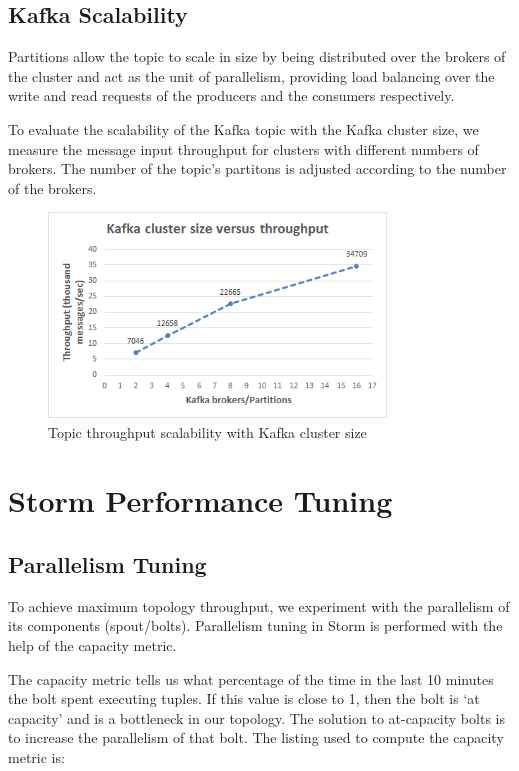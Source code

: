 \subsection{Kafka Scalability}

Partitions allow the topic to scale in size by being distributed over the brokers of the cluster and act as the unit of parallelism, providing load balancing over the write and read requests of the producers and the consumers respectively.

To evaluate the scalability of the Kafka topic with the Kafka cluster size, we measure the message input throughput for clusters with different numbers of brokers. The number of the topic's partitons is adjusted according to the number of the brokers.

\begin{figure}[H]
\centering
\includegraphics[width=0.8\textwidth]{figures/benchmarks_kafka_scalability}
\caption{Topic throughput scalability with Kafka cluster size}
\label{figure:benchmarks_kafka_scalability}
\end{figure}


\section{Storm Performance Tuning}

\subsection{Parallelism Tuning}\label{subsection:benchmarks_storm_tuning}

To achieve maximum topology throughput, we experiment with the parallelism of its components (spout/bolts). Parallelism tuning in Storm is performed with the help of the capacity metric. 

The capacity metric tells us what percentage of the time in the last 10 minutes the bolt spent executing tuples. If this value is close to 1, then the bolt is `at capacity' and is a bottleneck in our topology. The solution to at-capacity bolts is to increase the parallelism of that bolt. The listing used to compute the capacity metric is:

